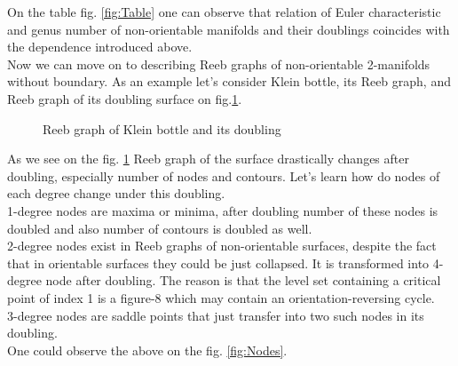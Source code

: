 \documentclass[]{article}
\begin{document}
On the table fig. \ref{fig:Table} one can observe that relation of Euler characteristic and genus number of non-orientable manifolds and their doublings coincides with the dependence introduced above. \\
Now we can move on to describing Reeb graphs of non-orientable 2-manifolds without boundary. As an example let's consider Klein bottle, its Reeb graph, and Reeb graph of its doubling surface on fig.\ref{fig:Klein}. \\
\begin{figure}[h!]
\caption{Reeb graph of Klein bottle and its doubling}
\label{fig:Klein}
\end{figure}
As we see on the fig. \ref{fig:Klein} Reeb graph of the surface drastically changes after doubling, especially number of nodes and contours.  Let's learn how do nodes of each degree change under this doubling. \\
1-degree nodes are maxima or minima, after doubling number of these nodes is doubled and also number of contours is doubled as well. \\
2-degree nodes exist in Reeb graphs of non-orientable surfaces, despite the fact that in orientable surfaces they could be just collapsed. It is transformed into 4-degree node after doubling. The reason is that the level set containing a critical point of index 1 is a figure-8 which may contain an orientation-reversing cycle. \\
3-degree nodes are saddle points that just transfer into two such nodes in its doubling. \\
One could observe the above on the fig. \ref{fig:Nodes}.  
\end{document}
